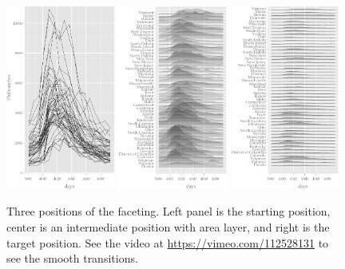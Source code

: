 \documentclass[12pt]{article}
\begin{document}
\begin{center}
\begin{figure}[H]
\begin{centering}
\includegraphics[width=0.32\textwidth]{graph/pipeline-22-original}
\includegraphics[width=0.32\textwidth]{graph/pipeline-22-smooth}
\includegraphics[width=0.32\textwidth]{graph/pipeline-22-jump}
\par\end{centering}

\caption{\label{fig:smoothness}Three positions of the faceting. Left panel
is the starting position, center is an intermediate position with
area layer, and right is the target position. See the video at \url{https://vimeo.com/112528131} to see the smooth transitions.}
\end{figure}

\par\end{center}
\end{document}

